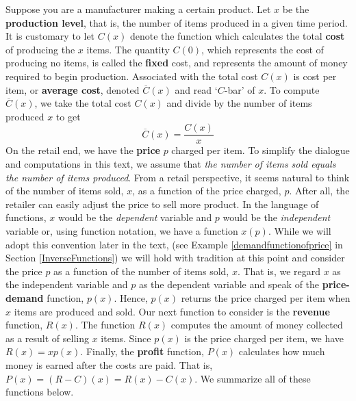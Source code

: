 Suppose you are a manufacturer making a certain product. Let $x$ be the \textbf{production level}, that is, the number of items produced in a given time period. It is customary to let $C(x)$ denote the function which calculates the total \textbf{cost} of producing the $x$ items.  The quantity $C(0)$, which represents the cost of producing no items, is called the \textbf{fixed} cost, and represents the amount of money required to begin production. Associated with the total cost $C(x)$ is cost per item, or \textbf{average cost}, denoted $\overline{C}(x)$ and read `$C$-bar' of $x$.  To compute $\overline{C}(x)$,  we take the total cost $C(x)$ and divide by the number of items produced $x$ to get \[ \overline{C}(x) = \dfrac{C(x)}{x}\] On the retail end, we have the \textbf{price} $p$ charged per item.  To simplify the dialogue and computations in this text, we assume that \textit{the number of items sold equals the number of items produced}. From a retail perspective, it seems natural to think of the number of items sold, $x$, as a function of the price charged, $p$.  After all, the retailer can easily adjust the price to sell more product.  In the language of functions,  $x$ would be the \textit{dependent} variable and $p$ would be the \textit{independent} variable or, using function notation, we have a function $x(p)$.  While we will adopt this convention later in the text, (see Example \ref{demandfunctionofprice} in Section \ref{InverseFunctions}) we will hold with tradition at this point and consider the price $p$ as a function of the number of items sold, $x$.  That is, we regard $x$ as the independent variable and $p$ as the dependent variable and speak of the \textbf{price-demand} function, $p(x)$.  Hence, $p(x)$ returns the price charged per item when $x$ items are produced and sold.   Our next function to consider is the \textbf{revenue} function, $R(x)$.  The function $R(x)$ computes the amount of money collected as a result of selling $x$ items.  Since $p(x)$ is the price charged per item, we have $R(x)= x p(x)$.  Finally, the \textbf{profit} function, $P(x)$ calculates how much money is earned after the costs are paid.  That is, $P(x) = (R-C)(x) = R(x) - C(x)$.  We summarize all of these functions below.

\smallskip

